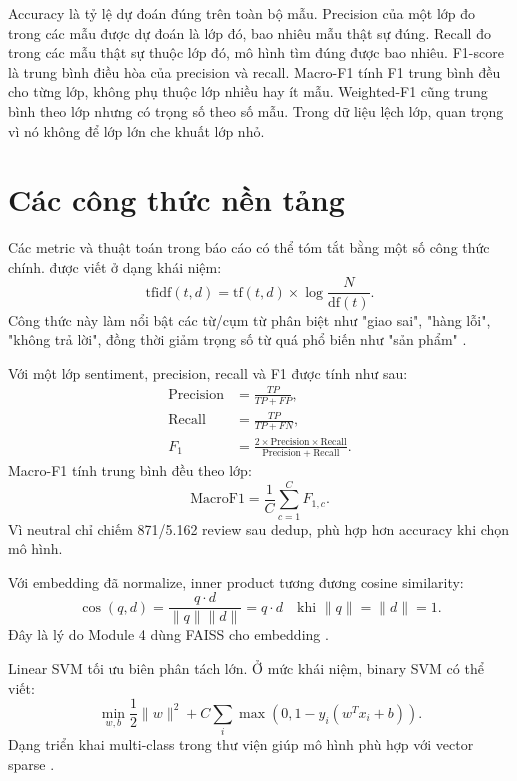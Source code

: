 Accuracy là tỷ lệ dự đoán đúng trên toàn bộ mẫu. Precision của một lớp đo trong các mẫu được dự đoán là lớp đó, bao nhiêu mẫu thật sự đúng. Recall đo trong các mẫu thật sự thuộc lớp đó, mô hình tìm đúng được bao nhiêu. F1-score là trung bình điều hòa của precision và recall. Macro-F1 tính F1 trung bình đều cho từng lớp, không phụ thuộc lớp nhiều hay ít mẫu. Weighted-F1 cũng trung bình theo lớp nhưng có trọng số theo số mẫu. Trong dữ liệu lệch lớp, \MacroFOne{} quan trọng vì nó không để lớp lớn che khuất lớp nhỏ.


\section{Các công thức nền tảng}
Các metric và thuật toán trong báo cáo có thể tóm tắt bằng một số công thức chính. \TFIDF{} được viết ở dạng khái niệm:
\begin{equation}
\mathrm{tfidf}(t,d)=\mathrm{tf}(t,d)\times \log\frac{N}{\mathrm{df}(t)}.
\end{equation}
Công thức này làm nổi bật các từ/cụm từ phân biệt như "giao sai", "hàng lỗi", "không trả lời", đồng thời giảm trọng số từ quá phổ biến như "sản phẩm" \cite{salton1988term,manning2008ir}.

Với một lớp sentiment, precision, recall và F1 được tính như sau:
\begin{align}
\mathrm{Precision} &= \frac{TP}{TP+FP},\\
\mathrm{Recall} &= \frac{TP}{TP+FN},\\
F_1 &= \frac{2\times \mathrm{Precision}\times \mathrm{Recall}}{\mathrm{Precision}+\mathrm{Recall}}.
\end{align}
Macro-F1 tính trung bình đều theo lớp:
\begin{equation}
\mathrm{MacroF1}=\frac{1}{C}\sum_{c=1}^{C}F_{1,c}.
\end{equation}
Vì neutral chỉ chiếm 871/5.162 review sau dedup, \MacroFOne{} phù hợp hơn accuracy khi chọn mô hình.

Với embedding đã normalize, inner product tương đương cosine similarity:
\begin{equation}
\cos(q,d)=\frac{q\cdot d}{\|q\|\|d\|}=q\cdot d \quad \text{khi } \|q\|=\|d\|=1.
\end{equation}
Đây là lý do Module 4 dùng FAISS  cho embedding \MultilingualE{} \cite{johnson2019billion,wang2022e5}.

Linear SVM tối ưu biên phân tách lớn. Ở mức khái niệm, binary SVM có thể viết:
\begin{equation}
\min_{w,b} \frac{1}{2}\|w\|^2 + C\sum_i \max(0,1-y_i(w^Tx_i+b)).
\end{equation}
Dạng triển khai multi-class trong thư viện giúp mô hình phù hợp với vector \TFIDF{} sparse \cite{cortes1995support,fan2008liblinear,pedregosa2011scikit}.


